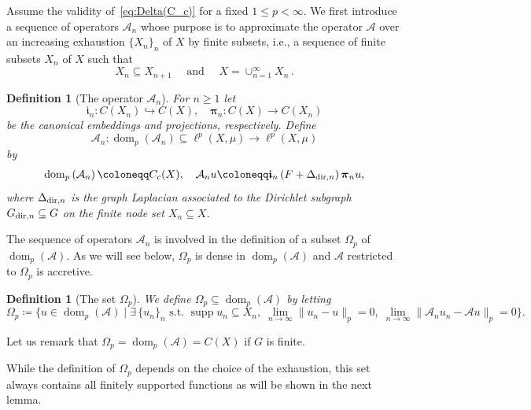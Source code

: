\documentclass[journal]{article}
\theoremstyle{nonitalic}
\theoremstyle{nonitalic}
\theoremstyle{plain} %
\newtheorem{definition}[theorem]{Definition}
\numberwithin{equation}{section}
\newcommand{\dom}{\operatorname{dom}}
\newcommand{\Deltadirn}{\Delta_{\textnormal{dir},n}}
\newcommand{\Amin}{\mathcal{A}_{n}}
\begin{document}
Assume the validity of~\eqref{eq:Delta(C_c)} for a fixed $1\leq p < \infty$. We first introduce a sequence of operators $\Amin$ whose purpose is to approximate the operator $\mathcal{A}$ over an increasing exhaustion $\{X_n\}_n$ of $X$ by finite subsets, i.e., a sequence of finite subsets $X_n$ of $X$ such that $$X_n \subseteq X_{n+1} \quad \text{ and }\quad  X=\cup_{n=1}^{\infty} X_n\,.$$
\begin{definition}[The operator $\Amin$]\label{def:Amin}
For $n\geq 1$ let 
\begin{equation*}\label{eq:embedding-projection2}
\boldsymbol{\mathfrak{i}}_{n} \colon C(X_{n}) \hookrightarrow C(X), \quad  \boldsymbol{\pi}_n \colon C(X) \to C(X_n)
\end{equation*}
be the canonical embeddings and projections, respectively. 
Define 
	$$
	\Amin \colon \dom_p\left( \Amin \right)\subseteq \ell^{p}\left(X,\mu\right) \to \ell^{p}\left(X,\mu\right)
	$$
	by
	\begin{align*}
		\dom_p\left( \Amin \right)\coloneqq C_c(X), \quad \Amin u\coloneqq \boldsymbol{\mathfrak{i}}_{n}\left(F + \Deltadirn \right)\boldsymbol{\pi}_{n} u,
	\end{align*}
	where $\Deltadirn$ is the graph Laplacian associated to the Dirichlet subgraph $G_{\textnormal{dir},n} \subseteq G$ on the finite node set $X_n\subseteq X$.
\end{definition}


The sequence of operators $\Amin$ is involved in the definition of a subset $\Omega_p$ of $\dom_p(\mathcal{A})$. As we will see below, $\Omega_p$ is dense in $\dom_p(\mathcal{A})$ and $\mathcal{A}$ restricted to $\Omega_p$ is accretive.  
\begin{definition}[The set $\Omega_p$]\label{def:Omega}
 We define $\Omega_p \subseteq \dom_p(\mathcal{A})$ by letting
 \begin{equation*}\label{eq:omega2}
		\Omega_p\coloneqq \{u \in \dom_p(\mathcal{A}) \mid \exists\, \{u_n\}_n \mbox{ s.t. } \operatorname{supp}u_n\subseteq X_n,\; \lim_{n\to \infty}\|u_n -u \|_p=0,\; \lim_{n\to \infty}\|\Amin u_n -\mathcal{A}u \|_p=0 \}.
	\end{equation*}
\end{definition}
Let us remark that $\Omega_p = \dom_p(\mathcal{A}) = C(X)$
if $G$ is finite.


While the definition of $\Omega_p$ depends on the choice of the exhaustion,
this set always contains all finitely supported functions as will be shown in the next lemma. 
\end{document}
